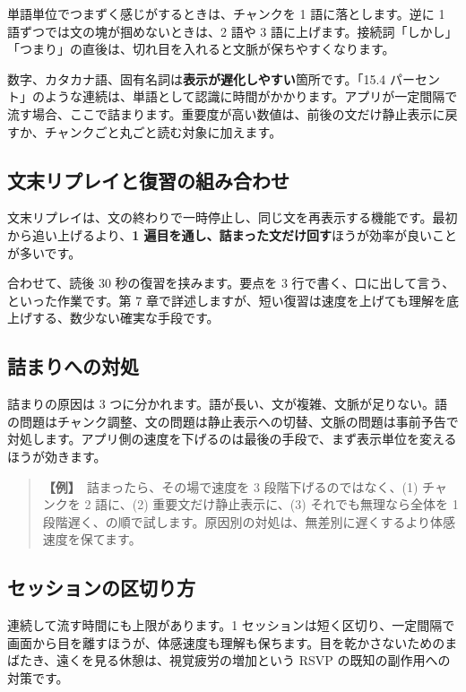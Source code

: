 \documentclass{article}
\begin{document}
単語単位でつまずく感じがするときは、チャンクを 1 語に落とします。逆に 1 語ずつでは文の塊が掴めないときは、2 語や 3 語に上げます。接続詞「しかし」「つまり」の直後は、切れ目を入れると文脈が保ちやすくなります。

数字、カタカナ語、固有名詞は\textbf{表示が遅化しやすい}箇所です。「15.4 パーセント」のような連続は、単語として認識に時間がかかります。アプリが一定間隔で流す場合、ここで詰まります。重要度が高い数値は、前後の文だけ静止表示に戻すか、チャンクごと丸ごと読む対象に加えます。

\subsection{文末リプレイと復習の組み合わせ}

文末リプレイは、文の終わりで一時停止し、同じ文を再表示する機能です。最初から追い上げるより、\textbf{1 遍目を通し、詰まった文だけ回す}ほうが効率が良いことが多いです。

合わせて、読後 30 秒の復習を挟みます。要点を 3 行で書く、口に出して言う、といった作業です。第 7 章で詳述しますが、短い復習は速度を上げても理解を底上げする、数少ない確実な手段です。

\subsection{詰まりへの対処}

詰まりの原因は 3 つに分かれます。語が長い、文が複雑、文脈が足りない。語の問題はチャンク調整、文の問題は静止表示への切替、文脈の問題は事前予告で対処します。アプリ側の速度を下げるのは最後の手段で、まず表示単位を変えるほうが効きます。

\begin{quote}
\textbf{【例】}\ 詰まったら、その場で速度を 3 段階下げるのではなく、(1) チャンクを 2 語に、(2) 重要文だけ静止表示に、(3) それでも無理なら全体を 1 段階遅く、の順で試します。原因別の対処は、無差別に遅くするより体感速度を保てます。
\end{quote}

\subsection{セッションの区切り方}

連続して流す時間にも上限があります。1 セッションは短く区切り、一定間隔で画面から目を離すほうが、体感速度も理解も保ちます。目を乾かさないためのまばたき、遠くを見る休憩は、視覚疲労の増加という RSVP の既知の副作用への対策です。
\end{document}
